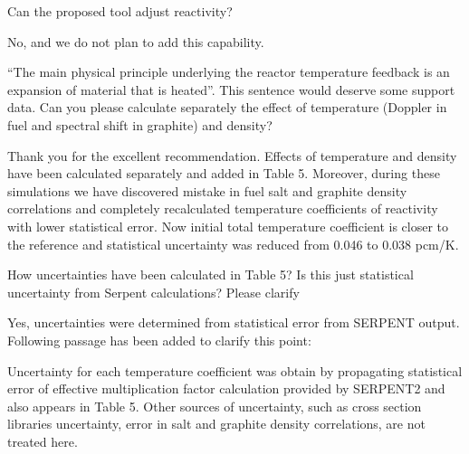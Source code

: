 \documentclass[answers,11pt]{exam}
\begin{document}
\begin{questions}
        \question Can the proposed tool adjust reactivity?
        \begin{solution}
                No, and we do not plan to add this capability.
        \end{solution}


        \question ``The main physical principle underlying the reactor 
        temperature feedback is an expansion of material that is heated''. This 
        sentence would deserve some support data. Can you please calculate 
        separately the effect of temperature (Doppler in fuel and spectral 
        shift in graphite) and density?
        \begin{solution}
                Thank you for the excellent recommendation. Effects of temperature
                 and density have been calculated separately and added in Table 5.
                 Moreover, during these simulations we have discovered mistake in 
                 fuel salt and graphite density correlations and completely 
                 recalculated temperature coefficients of reactivity with lower 
                 statistical error. Now initial total temperature coefficient is 
                 closer to the reference and statistical uncertainty was reduced 
                 from 0.046 to 0.038 pcm/K.
        \end{solution}


        \question How uncertainties have been calculated in Table 5? Is this 
        just statistical uncertainty from Serpent calculations? Please clarify
        \begin{solution}
                Yes, uncertainties were determined from statistical error 
                from SERPENT output. Following passage has been added to clarify
                 this point:
                 
                 Uncertainty for each temperature coefficient was obtain by 
                 propagating statistical error of effective multiplication factor 
                 calculation provided by SERPENT2 and also appears in Table 5. 
                 Other sources of uncertainty, such as cross section libraries 
				 uncertainty, error in salt and graphite density correlations, 
				 are not treated here.
        \end{solution}


\end{questions}
\end{document}
